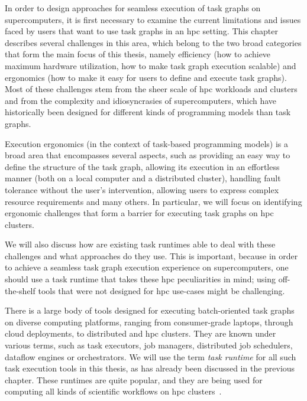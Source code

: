 In order to design approaches for seamless execution of task graphs on supercomputers, it is first
necessary to examine the current limitations and issues faced by users that want to use task graphs
in an \gls{hpc} setting. This chapter describes several challenges in this area, which
belong to the two broad categories that form the main focus of this thesis, namely efficiency (how
to achieve maximum hardware utilization, how to make task graph execution scalable) and ergonomics
(how to make it easy for users to define and execute task graphs). Most of these challenges stem
from the sheer scale of \gls{hpc} workloads and clusters and from the complexity and
idiosyncrasies of supercomputers, which have historically been designed for different kinds of
programming models than task graphs.

Execution ergonomics (in the context of task-based programming models) is a broad area that
encompasses several aspects, such as providing an easy way to define the structure of the task
graph, allowing its execution in an effortless manner (both on a local computer and a distributed
cluster), handling fault tolerance without the user's intervention, allowing users to express
complex resource requirements and many others. In particular, we will focus on identifying
ergonomic challenges that form a barrier for executing task graphs on \gls{hpc}
clusters.

We will also discuss how are existing task runtimes able to deal with these challenges and what
approaches do they use. This is important, because in order to achieve a seamless task graph
execution experience on supercomputers, one should use a task runtime that takes these
\gls{hpc} peculiarities in mind; using off-the-shelf tools that were not designed for
\gls{hpc} use-cases might be challenging.

There is a large body of tools designed for executing batch-oriented task graphs on diverse
computing platforms, ranging from consumer-grade laptops, through cloud deployments, to distributed
and \gls{hpc} clusters. They are known under various terms, such as task executors,
job managers, distributed job schedulers, dataflow engines or orchestrators. We will use the term
\emph{task runtime} for all such task execution tools in this thesis, as has already been
discussed in the previous chapter. These runtimes are quite popular, and they are being used for
computing all kinds of scientific workflows on \gls{hpc}
clusters~\cite{hpc_tasks, hpc_tasks_2, hpc_tasks_3, pegasus}.

